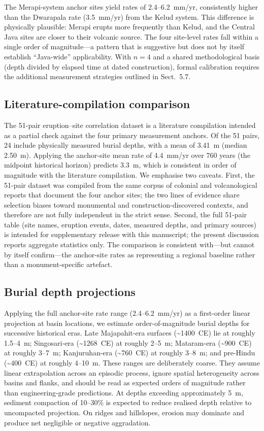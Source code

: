 \documentclass[12pt,a4paper]{article}
\begin{document}
The Merapi-system anchor sites yield rates of 2.4--6.2~mm/yr, consistently higher than the Dwarapala rate (3.5~mm/yr) from the Kelud system. This difference is physically plausible: Merapi erupts more frequently than Kelud, and the Central Java sites are closer to their volcanic source. The four site-level rates fall within a single order of magnitude---a pattern that is suggestive but does not by itself establish ``Java-wide'' applicability. With $n=4$ and a shared methodological basis (depth divided by elapsed time at dated construction), formal calibration requires the additional measurement strategies outlined in Sect.~5.7.

\subsection{Literature-compilation comparison}

The 51-pair eruption--site correlation dataset is a literature compilation intended as a partial check against the four primary measurement anchors. Of the 51 pairs, 24 include physically measured burial depths, with a mean of 3.41~m (median 2.50~m). Applying the anchor-site mean rate of 4.4~mm/yr over 760 years (the midpoint historical horizon) predicts 3.3~m, which is consistent in order of magnitude with the literature compilation. We emphasise two caveats. First, the 51-pair dataset was compiled from the same corpus of colonial and volcanological reports that document the four anchor sites; the two lines of evidence share selection biases toward monumental and construction-discovered contexts, and therefore are not fully independent in the strict sense. Second, the full 51-pair table (site names, eruption events, dates, measured depths, and primary sources) is intended for supplementary release with this manuscript; the present discussion reports aggregate statistics only. The comparison is consistent with---but cannot by itself confirm---the anchor-site rates as representing a regional baseline rather than a monument-specific artefact.

\subsection{Burial depth projections}

Applying the full anchor-site rate range (2.4--6.2~mm/yr) as a first-order linear projection at basin locations, we estimate order-of-magnitude burial depths for successive historical eras. Late Majapahit-era surfaces (\textasciitilde1400~CE) lie at roughly 1.5--4~m; Singosari-era (\textasciitilde1268~CE) at roughly 2--5~m; Mataram-era (\textasciitilde900~CE) at roughly 3--7~m; Kanjuruhan-era (\textasciitilde760~CE) at roughly 3--8~m; and pre-Hindu (\textasciitilde400~CE) at roughly 4--10~m. These ranges are deliberately coarse. They assume linear extrapolation across an episodic process, ignore spatial heterogeneity across basins and flanks, and should be read as expected orders of magnitude rather than engineering-grade predictions. At depths exceeding approximately 5~m, sediment compaction of 10--30\% is expected to reduce realised depth relative to uncompacted projection. On ridges and hillslopes, erosion may dominate and produce net negligible or negative aggradation.
\end{document}
